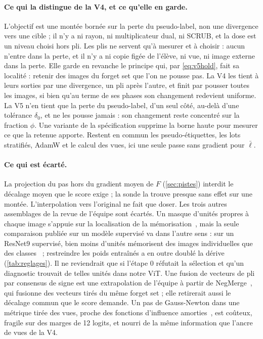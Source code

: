 \documentclass[11pt,a4paper]{article}
\begin{document}
\paragraph{Ce qui la distingue de la V4, et ce qu'elle en garde.} L'objectif est une montée bornée sur
la perte du pseudo-label, non une divergence vers une cible ; il n'y a ni rayon, ni multiplicateur
dual, ni SCRUB, et la dose est un niveau choisi hors pli. Les plis ne servent qu'à mesurer et à
choisir : aucun n'entre dans la perte, et il n'y a ni copie figée de l'élève, ni vue, ni image externe
dans la perte. Elle garde en revanche le principe qui, par \eqref{eq:v5hold}, fait sa localité :
retenir des images du forget set que l'on ne pousse pas. La V4 les tient à leurs sorties par une
divergence, un pli après l'autre, et finit par pousser toutes les images, si bien qu'au terme de ses
phases son changement redevient uniforme. La V5 n'en tient que la perte du pseudo-label, d'un seul
côté, au-delà d'une tolérance $\delta_0$, et ne les pousse jamais : son changement reste concentré sur
la fraction $\phi$. Une variante de la spécification supprime la borne haute pour mesurer ce que la
retenue apporte. Restent en commun les pseudo-étiquettes, les lots stratifiés, AdamW et le calcul des
vues, ici une seule passe sans gradient pour $\bar\ell$.

\paragraph{Ce qui est écarté.} La projection du pas hors du gradient moyen de $F$ (\cref{sec:pistes})
interdit le décalage moyen que le score exige ; la sonde la trouve presque sans effet sur une montée.
L'interpolation vers l'original ne fait que doser. Les trois autres assemblages de la revue de l'équipe
sont écartés. Un masque d'unités propres à chaque image s'appuie sur la localisation de la
mémorisation~\cite{maini2023localized}, mais la seule comparaison publiée sur un modèle supervisé va
dans l'autre sens : sur un ResNet9 supervisé, bien moins d'unités mémorisent des images individuelles
que des classes~\cite{wang2024localizing} ; restreindre les poids entraînés a en outre doublé la dérive
(\cref{tab:reglages}). Il ne reviendrait que si l'étape 0 réfutait la sélection et qu'un diagnostic
trouvait de telles unités dans notre ViT. Une fusion de vecteurs de pli par consensus de signe est une
extrapolation de l'équipe à partir de NegMerge~\cite{kim2025negmerge}, qui fusionne des vecteurs tirés
du même forget set ; elle retirerait aussi le décalage commun que le score demande. Un pas de
Gauss-Newton dans une métrique tirée des vues, proche des fonctions d'influence amorties~\cite{bae2022pbrf},
est coûteux, fragile sur des marges de 12 logits, et nourri de la même information que l'ancre de vues
de la V4.
\end{document}

